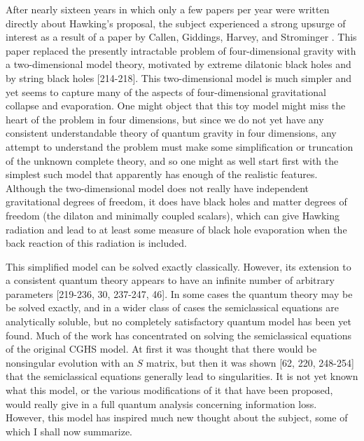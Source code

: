 \documentclass[12pt]{article}
\begin{document}
     After nearly sixteen years in which only a few papers per year
were
written directly about Hawking's proposal, the subject experienced a
strong
upsurge of interest as a result of a paper by Callen, Giddings,
Harvey, and
Strominger \cite{CGHS}.  This paper replaced the presently
intractable problem
of four-dimensional gravity with a two-dimensional model theory,
motivated by
extreme dilatonic black holes \cite{Gib88,GHS} and by string black
holes
[214-218].  This two-dimensional model is much simpler
and yet seems to capture many of the aspects of four-dimensional
gravitational
collapse and evaporation.  One might object that this toy model might
miss the heart of the problem in four dimensions, but since we do not
yet have
any consistent understandable theory of quantum gravity in four
dimensions, any
attempt to understand the problem must make some simplification or
truncation
of the unknown complete theory, and so one might as well start first
with the
simplest such model that apparently has enough of the realistic
features.
Although the two-dimensional model  does not really have independent
gravitational degrees of freedom, it does have black holes and matter
degrees
of freedom (the dilaton and minimally coupled scalars), which can
give Hawking
radiation and lead to at least some measure of black hole evaporation
when the
back reaction of this radiation is included.

     This simplified model can be solved exactly classically.
However, its
extension to a consistent quantum theory appears to have an infinite
number of arbitrary parameters
[219-236, 30, 237-247, 46].
In some cases the quantum theory
may be be solved exactly, and in a wider class of cases the
semiclassical
equations are analytically soluble, but no completely satisfactory
quantum
model has been yet found.  Much of the work has concentrated on
solving
the semiclassical equations of the original CGHS \cite{CGHS} model.
At first it was thought \cite{CGHS} that there would be nonsingular
evolution with an $S$ matrix, but then it was shown
[62, 220, 248-254]
that the semiclassical equations generally lead to singularities.
It is not yet known what this
model, or the various modifications of it that have been proposed,
would really
give in a full quantum analysis concerning information loss.
However, this
model has inspired much new thought about the subject, some of which
I shall
now summarize.
\end{document}
